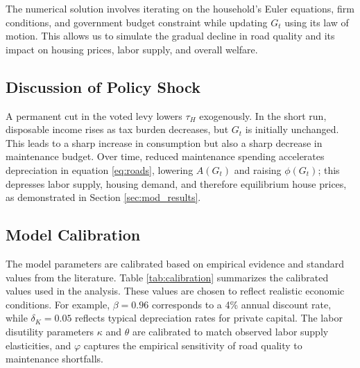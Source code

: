 The numerical solution involves iterating on the household’s Euler equations, firm conditions, and government budget constraint while updating $G_t$ using its law of motion. This allows us to simulate the gradual decline in road quality and its impact on housing prices, labor supply, and overall welfare.

\subsection{Discussion of Policy Shock}
A permanent cut in the voted levy lowers $\tau_H$ exogenously. In the short run, disposable income rises as tax burden decreases, but $G_t$ is initially unchanged. This leads to a sharp increase in consumption but also a sharp decrease in maintenance budget. Over time, reduced maintenance spending accelerates depreciation in equation \ref{eq:roads}, lowering $A(G_t)$ and raising $\phi(G_t)$; this depresses labor supply, housing demand, and therefore equilibrium house prices, as demonstrated in Section \ref{sec:mod_results}.

\subsection{Model Calibration}

The model parameters are calibrated based on empirical evidence and standard values from the literature. Table \ref{tab:calibration} summarizes the calibrated values used in the analysis. These values are chosen to reflect realistic economic conditions. For example, $\beta = 0.96$ corresponds to a 4\% annual discount rate, while $\delta_K = 0.05$ reflects typical depreciation rates for private capital. The labor disutility parameters $\kappa$ and $\theta$ are calibrated to match observed labor supply elasticities, and $\varphi$ captures the empirical sensitivity of road quality to maintenance shortfalls.

